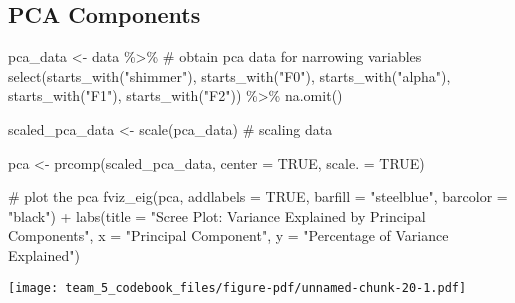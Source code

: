 \documentclass[
  letterpaper,
  DIV=11,
  numbers=noendperiod]{scrartcl}
\newenvironment{Shaded}{\begin{snugshade}}{\end{snugshade}}
\newcommand{\AttributeTok}[1]{\textcolor[rgb]{0.40,0.45,0.13}{#1}}
\newcommand{\CommentTok}[1]{\textcolor[rgb]{0.37,0.37,0.37}{#1}}
\newcommand{\ConstantTok}[1]{\textcolor[rgb]{0.56,0.35,0.01}{#1}}
\newcommand{\FunctionTok}[1]{\textcolor[rgb]{0.28,0.35,0.67}{#1}}
\newcommand{\NormalTok}[1]{\textcolor[rgb]{0.00,0.23,0.31}{#1}}
\newcommand{\OtherTok}[1]{\textcolor[rgb]{0.00,0.23,0.31}{#1}}
\newcommand{\SpecialCharTok}[1]{\textcolor[rgb]{0.37,0.37,0.37}{#1}}
\newcommand{\StringTok}[1]{\textcolor[rgb]{0.13,0.47,0.30}{#1}}
\begin{document}
\subsection{PCA Components}\label{pca-components}

\begin{Shaded}
\begin{Highlighting}[]
\NormalTok{pca\_data }\OtherTok{\textless{}{-}}\NormalTok{ data }\SpecialCharTok{\%\textgreater{}\%} \CommentTok{\# obtain pca data for narrowing variables}
  \FunctionTok{select}\NormalTok{(}\FunctionTok{starts\_with}\NormalTok{(}\StringTok{"shimmer"}\NormalTok{),}
         \FunctionTok{starts\_with}\NormalTok{(}\StringTok{"F0"}\NormalTok{),}
         \FunctionTok{starts\_with}\NormalTok{(}\StringTok{"alpha"}\NormalTok{),}
         \FunctionTok{starts\_with}\NormalTok{(}\StringTok{"F1"}\NormalTok{),}
         \FunctionTok{starts\_with}\NormalTok{(}\StringTok{"F2"}\NormalTok{)) }\SpecialCharTok{\%\textgreater{}\%}
  \FunctionTok{na.omit}\NormalTok{()}

\NormalTok{scaled\_pca\_data }\OtherTok{\textless{}{-}} \FunctionTok{scale}\NormalTok{(pca\_data) }\CommentTok{\# scaling data}

\NormalTok{pca }\OtherTok{\textless{}{-}} \FunctionTok{prcomp}\NormalTok{(scaled\_pca\_data, }\AttributeTok{center =} \ConstantTok{TRUE}\NormalTok{, }\AttributeTok{scale. =} \ConstantTok{TRUE}\NormalTok{)}

\CommentTok{\# plot the pca}
\FunctionTok{fviz\_eig}\NormalTok{(pca, }
         \AttributeTok{addlabels =} \ConstantTok{TRUE}\NormalTok{,}
         \AttributeTok{barfill =} \StringTok{"steelblue"}\NormalTok{,}
         \AttributeTok{barcolor =} \StringTok{"black"}\NormalTok{) }\SpecialCharTok{+}
  \FunctionTok{labs}\NormalTok{(}\AttributeTok{title =} \StringTok{"Scree Plot: Variance Explained by Principal Components"}\NormalTok{,}
       \AttributeTok{x =} \StringTok{"Principal Component"}\NormalTok{,}
       \AttributeTok{y =} \StringTok{"Percentage of Variance Explained"}\NormalTok{)}
\end{Highlighting}
\end{Shaded}

\begin{center}
\texttt{[image: team\_5\_codebook\_files/figure-pdf/unnamed-chunk-20-1.pdf]}
\end{center}

\begin{Shaded}
\end{Shaded}
\end{document}
